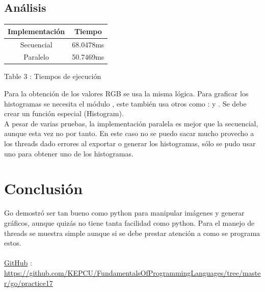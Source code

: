 \documentclass[https://www.overleaf.com/project/63761df255a8a9f4a15c3579
	letterpaper, %
	10pt, %
]{CSUniSchoolLabReport}
\begin{document}
\subsection*{Análisis}
\begin{center}
    \begin{tabular}{| c | c |}
        \hline
            Implementación & Tiempo 
             \\ 
        \hline
            Secuencial & 68.0478ms
            \\
            Paralelo & 50.7469ms
            \\
        \hline
    \end{tabular}
\end{center}
 \begin{center}
    Table 3 : Tiempos de ejecución
 \end{center}

Para la obtención de los valores RGB se usa la misma lógica. Para graficar los histogramas se necesita el módulo 
, este también usa otros como :  y . Se debe crear un función especial (Histogram).
\\
A pesar de varias pruebas, la implementación paralela es mejor que la secuencial, aunque esta vez no por tanto. En este caso no se puedo sacar mucho provecho a los threads dado errores al exportar o generar los histogramas, sólo se pudo usar uno para obtener uno de los histogramas.


\section*{Conclusión}
Go demostró ser tan bueno como python para manipular imágenes y generar gráficos, aunque quizás no tiene tanta facilidad como python. Para el manejo de threads se muestra simple aunque si se debe prestar atención a como se programa estos.
\\
\\
\href{https://github.com/KEPCU/FundamentalsOfProgrammingLanguages/tree/master/go/practice17}{GitHub} : \url{https://github.com/KEPCU/FundamentalsOfProgrammingLanguages/tree/master/go/practice17}

\end{document}
